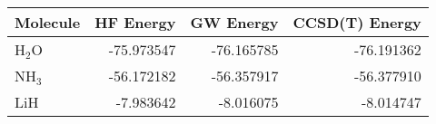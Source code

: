 \begin{tabular}{lrrr}
\toprule
Molecule & HF Energy & GW Energy & CCSD(T) Energy \\
\midrule
H$_2$O & -75.973547 & -76.165785 & -76.191362 \\
NH$_3$ & -56.172182 & -56.357917 & -56.377910 \\
LiH & -7.983642 & -8.016075 & -8.014747 \\
\bottomrule
\end{tabular}
